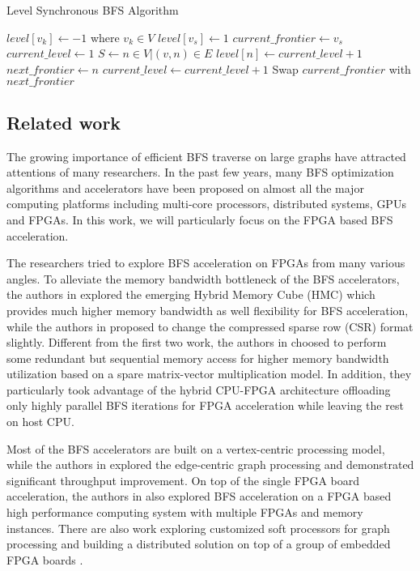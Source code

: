 \begin{algorithm}
    \small
	\caption{Level Synchronous BFS Algorithm} \label{alg:level-bfs}
	\begin{algorithmic}[1]
		\State $level[v_k] \gets -1$ where $v_k \in V$
		\State $level[v_s] \gets 1$
		\State $current\_frontier \gets v_s$
		\State $current\_level \gets 1$
		\State $S \gets {n \in V | (v, n) \in E}$
		\State $level[n] \gets current\_level + 1$
		\State $next\_frontier \gets n$
		\EndIf
		\EndFor
		\EndFor
		\State $current\_level \gets current\_level + 1$
		\State Swap $current\_frontier$ with $next\_frontier$
		\EndWhile
		\EndProcedure
	\end{algorithmic}
\end{algorithm}

\subsection{Related work}
The growing importance of efficient BFS traverse on large graphs 
have attracted attentions of many researchers. In the past few years, 
many BFS optimization algorithms and accelerators have been proposed 
on almost all the major computing platforms including multi-core processors, 
distributed systems, GPUs and FPGAs. In this work, we will 
particularly focus on the FPGA based BFS acceleration. 

The researchers tried to explore BFS acceleration 
on FPGAs from many various angles.
To alleviate the memory bandwidth bottleneck of the 
BFS accelerators, the authors in \cite{zhang2017boosting} 
explored the emerging Hybrid Memory Cube (HMC) which provides 
much higher memory bandwidth as well flexibility for BFS 
acceleration, while the authors in \cite{attia2014cygraph} 
proposed to change the compressed sparse row (CSR) format slightly. 
Different from the first two work, the authors in \cite{umuroglu2015hybrid} 
choosed to perform some redundant but sequential memory access for higher memory bandwidth 
utilization based on a spare matrix-vector multiplication model.
In addition, they particularly took advantage of the 
hybrid CPU-FPGA architecture offloading only highly parallel 
BFS iterations for FPGA acceleration while leaving the rest 
on host CPU.  

Most of the BFS accelerators are built on a vertex-centric 
processing model, while the authors 
in \cite{zhou2016high} explored the edge-centric graph processing and demonstrated 
significant throughput improvement. On top of the single FPGA board acceleration, 
the authors in \cite{attia2014cygraph, betkaoui2012reconfigurable} also explored 
BFS acceleration on a FPGA based high performance computing system with multiple 
FPGAs and memory instances. There are also work exploring customized soft processors 
for graph processing and building a distributed solution on 
top of a group of embedded FPGA boards \cite{kapre2015custom, wang2010message}.

